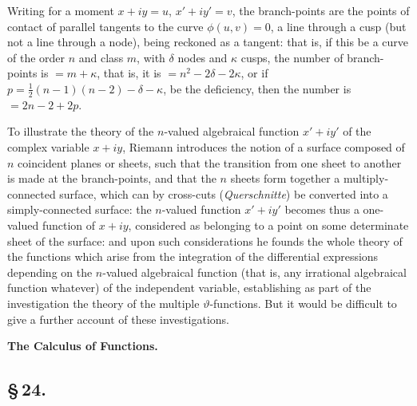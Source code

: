 \documentclass[11pt,a4paper]{article}
\begin{document}
Writing for a moment $x + iy = u$, $x' + iy' = v$, the branch-points are the points of contact of parallel tangents to the curve $\phi(u, v) = 0$, a line through a cusp (but not a line through a node), being reckoned as a tangent: that is, if this be a curve of the order $n$ and class $m$, with $\delta$ nodes and $\kappa$ cusps, the number of branch-points is $= m + \kappa$, that is, it is $= n^{2} - 2\delta - 2\kappa$, or if $p = \frac{1}{2}(n - 1)(n - 2) - \delta - \kappa$, be the deficiency, then the number is $= 2n - 2 + 2p$.

To illustrate the theory of the $n$-valued algebraical function $x' + iy'$ of the complex variable $x + iy$, Riemann introduces the notion of a surface composed of $n$ coincident planes or sheets, such that the transition from one sheet to another is made at the branch-points, and that the $n$ sheets form together a multiply-connected surface, which can by cross-cuts (\textit{Querschnitte}) be converted into a simply-connected surface: the $n$-valued function $x' + iy'$ becomes thus a one-valued function of $x + iy$, considered as belonging to a point on some determinate sheet of the surface: and upon such considerations he founds the whole theory of the functions which arise from the integration of the differential expressions depending on the $n$-valued algebraical function (that is, any irrational algebraical function whatever) of the independent variable, establishing as part of the investigation the theory of the multiple $\vartheta$-functions. But it would be difficult to give a further account of these investigations.

\smallskip
\begin{center}\textbf{The Calculus of Functions.}\end{center}

\subsection*{\S\,24.}
\end{document}
